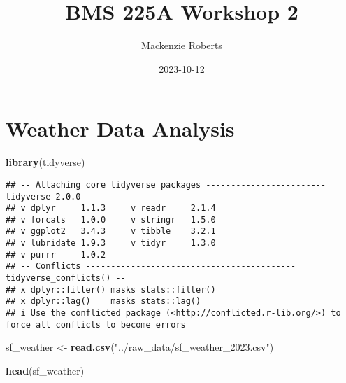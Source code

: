 \documentclass[
]{article}
\title{BMS 225A Workshop 2}
\author{Mackenzie Roberts}
\date{2023-10-12}
\newenvironment{Shaded}{\begin{snugshade}}{\end{snugshade}}
\newcommand{\FunctionTok}[1]{\textcolor[rgb]{0.13,0.29,0.53}{\textbf{#1}}}
\newcommand{\NormalTok}[1]{#1}
\newcommand{\OtherTok}[1]{\textcolor[rgb]{0.56,0.35,0.01}{#1}}
\newcommand{\StringTok}[1]{\textcolor[rgb]{0.31,0.60,0.02}{#1}}
\begin{document}
\maketitle

\hypertarget{weather-data-analysis}{%
\section{Weather Data Analysis}\label{weather-data-analysis}}

\begin{Shaded}
\begin{Highlighting}[]
\FunctionTok{library}\NormalTok{(tidyverse)}
\end{Highlighting}
\end{Shaded}

\begin{verbatim}
## -- Attaching core tidyverse packages ------------------------ tidyverse 2.0.0 --
## v dplyr     1.1.3     v readr     2.1.4
## v forcats   1.0.0     v stringr   1.5.0
## v ggplot2   3.4.3     v tibble    3.2.1
## v lubridate 1.9.3     v tidyr     1.3.0
## v purrr     1.0.2     
## -- Conflicts ------------------------------------------ tidyverse_conflicts() --
## x dplyr::filter() masks stats::filter()
## x dplyr::lag()    masks stats::lag()
## i Use the conflicted package (<http://conflicted.r-lib.org/>) to force all conflicts to become errors
\end{verbatim}

\begin{Shaded}
\begin{Highlighting}[]
\NormalTok{sf\_weather }\OtherTok{\textless{}{-}} \FunctionTok{read.csv}\NormalTok{(}\StringTok{"../raw\_data/sf\_weather\_2023.csv"}\NormalTok{)}

\FunctionTok{head}\NormalTok{(sf\_weather)}
\end{Highlighting}
\end{Shaded}
\end{document}
